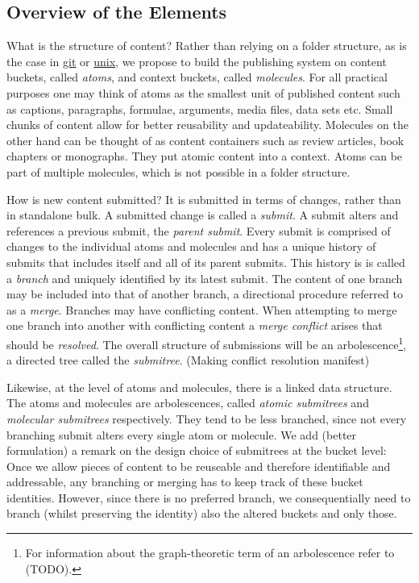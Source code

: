 \documentclass[14pt]{article}
\newcommand{\remark}[1]{{\color{purple} (#1)}}
\begin{document}
\subsection{Overview of the Elements}


What is the structure of content? Rather than relying on a folder structure, as is the case in \href{https://git-scm.com/}{git}\cite{torwalds} or \href{https://en.wikipedia.org/wiki/Unix_filesystem}{unix}\cite{unix}, we propose to build the publishing system on content buckets, called \textit{atoms}, and context buckets, called \textit{molecules}. For all practical purposes one may think of atoms as the smallest unit of published content such as captions, paragraphs, formulae, arguments, media files, data sets etc. Small chunks of content allow for better reusability and updateability. Molecules on the other hand can be thought of as content containers such as review articles, book chapters or monographs. They put atomic content into a context. Atoms can be part of multiple molecules, which is not possible in a folder structure.

How is new content submitted? It is submitted in terms of changes, rather than in standalone bulk. A submitted change is called a \textit{submit}. 
A submit alters and references a previous submit, the \textit{parent submit}. Every submit is comprised of changes to the individual atoms and molecules and has a unique history of submits that includes itself and all of its parent submits. This history is is called a \textit{branch} and uniquely identified by its latest submit. The content of one branch may be included into that of another branch, a directional procedure referred to as a \textit{merge}. Branches may have conflicting content. When attempting to merge one branch into another with conflicting content a \textit{merge conflict} arises that should be \textit{resolved}. The overall structure of submissions will be an arbolescence\footnote{For information about the graph-theoretic term of an arbolescence refer to \remark{TODO}.}, a directed tree called the \textit{submitree}. 
\remark{Making conflict resolution manifest}

Likewise, at the level of atoms and molecules, there is a linked data structure. The atoms and molecules are arbolescences, called  \textit{atomic submitrees} and \textit{molecular submitrees} respectively. They tend to be less branched, since not every branching submit alters every single atom or molecule. We add \remark{better formulation} a remark on the design choice of submitrees at the bucket level:
Once we allow pieces of content to be reuseable and therefore identifiable and addressable, any branching or merging has to keep track of these bucket identities. However, since there is no preferred branch, we consequentially need to branch (whilst preserving the identity) also the altered buckets and only those. 
\end{document}
